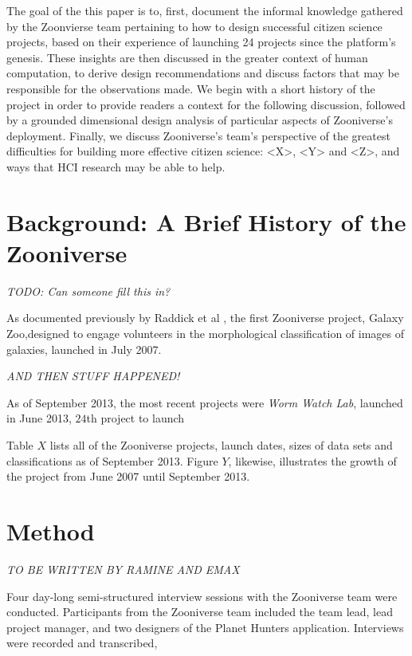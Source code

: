 \documentclass{sigchi}
\begin{document}
The goal of the this paper is to, first, document the informal
knowledge gathered by the Zoonvierse team pertaining to how to design
successful citizen science projects, based on their experience of
launching 24 projects since the platform's genesis.  These insights
are then discussed in the greater context of human computation, to
derive design recommendations and discuss factors that may be
responsible for the observations made. We begin with a short history
of the project in order to provide readers a context for the following
discussion, followed by a grounded dimensional design analysis of
particular aspects of Zooniverse's deployment.  Finally, we discuss 
Zooniverse's team's perspective of the greatest difficulties for
building more effective citizen science: <X>, <Y> and <Z>, and
ways that HCI research may be able to help.

\section{Background: A Brief History of the Zooniverse}

\emph{TODO: Can someone fill this in?}

As documented previously by Raddick et al \cite{raddick}, the first
Zooniverse project, Galaxy Zoo,designed to engage volunteers in the
morphological classification of images of galaxies, launched in July
2007\cite{galaxyzoo-launch}. 

\emph{AND THEN STUFF HAPPENED!}  

As of September 2013, the most recent projects were \emph{Worm Watch
  Lab}, launched in June 2013, $24$th project to launch

Table $X$ lists all of the Zooniverse projects, launch dates, sizes of
data sets and classifications as of September 2013.  Figure $Y$,
likewise, illustrates the growth of the project from June 2007 until
September 2013.


\section{Method}

\emph{TO BE WRITTEN BY RAMINE AND EMAX}

Four day-long semi-structured interview sessions with the Zooniverse
team were conducted. Participants from the Zooniverse team included
the team lead, lead project manager, and two designers of the Planet
Hunters application.  Interviews were recorded and transcribed,
\end{document}
